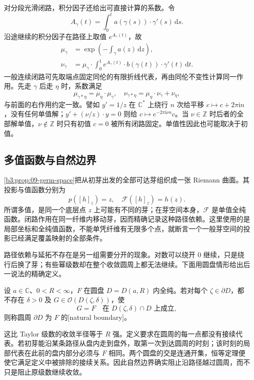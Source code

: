 \ProseParagraphBreak
对分段光滑闭路，积分因子还给出可直接计算的系数。令
\[
 A_\gamma(t)=\int_0^t a(\gamma(s))\cdot\gamma'(s)\,\mathrm ds.
\]
沿途继续的积分因子在路径上取值 \(e^{A_\gamma(t)}\)，故
\[
 \begin{aligned}
 \mu_\gamma&=\exp\left(-\int_\gamma a(z)\,\mathrm dz\right),\\
 \nu_\gamma&=\mu_\gamma\cdot\int_0^1
 e^{A_\gamma(t)}\cdot b(\gamma(t))\cdot\gamma'(t)\,\mathrm dt.
 \end{aligned}
\]
一般连续闭路可先取端点固定同伦的有限折线代表，再由同伦不变性计算同一作用。先走 \(\gamma\) 后走 \(\eta\) 时，系数满足
\[
 \mu_{\gamma*\eta}=\mu_\eta\cdot\mu_\gamma,\quad
 \nu_{\gamma*\eta}=\mu_\eta\cdot\nu_\gamma+\nu_\eta,
\]
与前面的右作用约定一致。譬如 \(y'=1/z\) 在 \(\mathbb C^*\) 上绕行 \(n\) 次给平移 \(c\mapsto c+2\pi\mathrm{i}n\)，没有任何单值解；\(y'+(\nu/z)\cdot y=0\) 则给 \(c\mapsto e^{-2\pi\mathrm{i}\nu n}c\)。当 \(\nu\in\mathbb Z\) 时后者的全部解单值，\(\nu\notin\mathbb Z\) 时只有初值 \(c=0\) 被所有闭路固定。单值性因此也可能取决于初值。

\subsection{多值函数与自然边界}
\label{b3:subsec:090303}

\cref{b3:prop:09-germ-space}把从初芽出发的全部可达芽组织成一张 Riemann 曲面。其投影与值函数分别为
\[
 p([h]_z)=z,\quad\mathcal F([h]_z)=h(z).
\]
所谓多值，是同一个底层点 \(z\) 上可能有不同的芽；在芽空间本身，\(\mathcal F\) 是单值全纯函数。闭路作用在同一纤维内移动芽，因而精确记录这种路径依赖。这里使用的是局部坐标和全纯值函数，不能单凭纤维有无限多个点，就断言一个一般芽空间的投影已经满足覆盖映射的全部条件。

\ProseParagraphBreak
路径依赖与延拓不存在是另一组需要分开的现象。对数可以绕开 \(0\) 继续，只是绕行后换了芽；有些幂级数却在整个收敛圆周上都无法继续。下面用圆盘情形给出后一说法的精确定义。

\begin{definition}\label{b3:def:09-natural-boundary}
设 \(a\in\mathbb C\)、\(0<R<\infty\)，\(F\) 在圆盘 \(D=D(a,R)\) 内全纯。若对每个 \(\zeta\in\partial D\)，都不存在 \(\delta>0\) 及 \(G\in\mathcal O(D(\zeta,\delta))\)，使
\[
 G=F\quad\text{在 }D(\zeta,\delta)\cap D\text{ 上成立},
\]
则称圆周 \(\partial D\) 为 \(F\) 的[natural boundary]。
\end{definition}

这比 Taylor 级数的收敛半径等于 \(R\) 强。定义要求在圆周的每一点都没有接续代表。若初芽能沿某条路径从盘内走到盘外，取第一次到达圆周的时刻；该时刻的局部代表在此前的盘内部分必须与 \(F\) 相同。两个圆盘的交是连通开集，恒等定理便使它满足定义中被排除的接续关系。因此自然边界确实阻止沿路径越过圆周，而不只是阻止原级数继续收敛。

